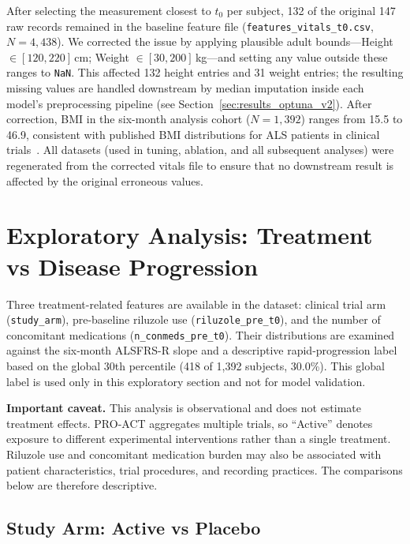 After selecting the measurement closest to $t_0$ per subject, 132 of the original 147 raw records remained in the baseline feature file (\texttt{features\_vitals\_t0.csv}, $N = 4{,}438$).
We corrected the issue by applying plausible adult bounds---Height $\in [120, 220]$\,cm; Weight $\in [30, 200]$\,kg---and setting any value outside these ranges to \texttt{NaN}.
This affected 132 height entries and 31 weight entries; the resulting missing values are handled downstream by median imputation inside each model's preprocessing pipeline (see Section~\ref{sec:results_optuna_v2}).
After correction, \gls{BMI} in the six-month analysis cohort ($N = 1{,}392$) ranges from 15.5 to 46.9, consistent with published \gls{BMI} distributions for \gls{ALS} patients in clinical trials~\cite{Anani2023}.
All datasets (used in tuning, ablation, and all subsequent analyses) were regenerated from the corrected vitals file to ensure that no downstream result is affected by the original erroneous values.


\section{Exploratory Analysis: Treatment vs Disease Progression}
\label{sec:results_eda_treatment}

Three treatment-related features are available in the dataset: clinical trial arm (\texttt{study\_arm}), pre-baseline riluzole use (\texttt{riluzole\_pre\_t0}), and the number of concomitant medications (\texttt{n\_conmeds\_pre\_t0}).
Their distributions are examined against the six-month \gls{ALSFRS-R} slope and a descriptive rapid-progression label based on the global 30th percentile (418 of 1,392 subjects, 30.0\%). This global label is used only in this exploratory section and not for model validation.

\textbf{Important caveat.}
This analysis is observational and does not estimate treatment effects. PRO-ACT aggregates multiple trials, so ``Active'' denotes exposure to different experimental interventions rather than a single treatment. Riluzole use and concomitant medication burden may also be associated with patient characteristics, trial procedures, and recording practices. The comparisons below are therefore descriptive.

\subsection{Study Arm: Active vs Placebo}
\label{subsec:results_eda_arm}

